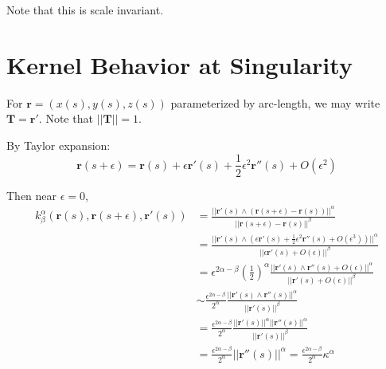 \documentclass[a4paper]{article}
\newcommand{\Tb}{\mathbf{T}}
\newcommand{\rb}{\mathbf{r}}
\newcommand{\norm}[1]{\lvert \lvert #1 \rvert \rvert}
\begin{document}
Note that this is scale invariant.


\section{Kernel Behavior at Singularity}
For $\rb = \left( x(s), y(s), z(s) \right)$ parameterized by arc-length, we may write $\Tb = \rb'$.
Note that $\norm{\Tb} = 1$.

By Taylor expansion:
\begin{equation}
    \rb (s + \epsilon) = \rb(s) + \epsilon \rb'(s) + \frac{1}{2} \epsilon^2 \rb''(s) + O \left( \epsilon^2 \right)
\end{equation}

Then near $\epsilon = 0$,
\begin{align}
    k_{\beta}^{\alpha} \left( \rb (s), \rb (s+\epsilon), \rb'(s) \right) &= \frac{\norm{\rb'(s) \wedge (\rb(s+\epsilon) - \rb(s))}^{\alpha}}{\norm{\rb(s+\epsilon) - \rb(s)}^{\beta}} \\
    &= \frac{\norm{\rb'(s) \wedge \left( \epsilon \rb'(s) + \frac{1}{2} \epsilon^2 \rb''(s) + O \left( \epsilon^3 \right) \right)}^{\alpha}}{\norm{\epsilon \rb'(s) + O \left( \epsilon \right)}^{\beta}} \\
    &= \epsilon^{2\alpha - \beta} \left( \frac{1}{2} \right)^{\alpha} \frac{\norm{\rb'(s) \wedge \rb''(s) + O\left( \epsilon \right)}^{\alpha}}{\norm{\rb'(s) + O \left( \epsilon \right)}^{\beta}} \\
    &\sim \frac{\epsilon^{2\alpha - \beta}}{2^{\alpha}} \frac{\norm{\rb'(s) \wedge \rb''(s)}^{\alpha}}{\norm{\rb'(s)}^{\beta}} \\
&= \frac{\epsilon^{2\alpha - \beta}}{2^{\alpha}} \frac{\norm{\rb'(s)}^{\alpha} \norm{\rb''(s)}^{\alpha}}{\norm{\rb'(s)}^{\beta}} \\
    &= \frac{\epsilon^{2\alpha - \beta}}{2^{\alpha}} \norm{\rb''(s)}^{\alpha} = \frac{\epsilon^{2\alpha - \beta}}{2^{\alpha}} \kappa^{\alpha}
\end{align}
\end{document}
